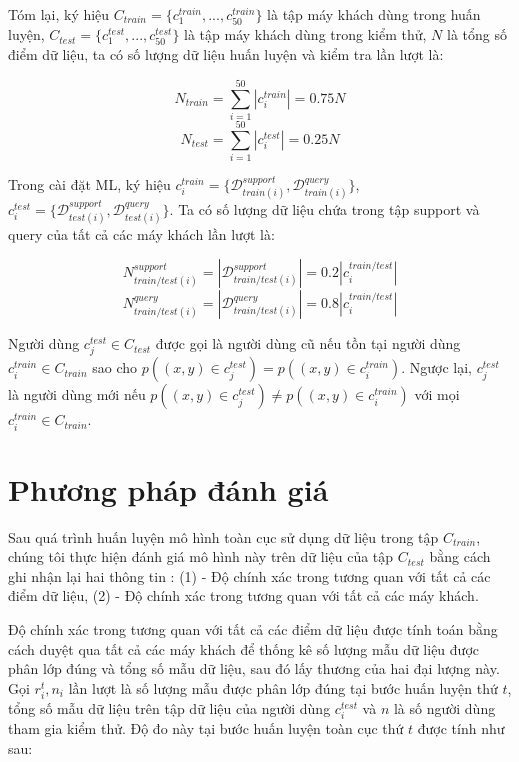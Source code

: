 Tóm lại, ký hiệu $C_{train} = \{c^{train}_1,...,c^{train}_{50}\}$ là tập máy khách dùng trong huấn luyện, $C_{test} = \{c^{test}_1,...,c^{test}_{50}\}$ là tập máy khách dùng trong kiểm thử, $N$ là tổng số điểm dữ liệu, ta có số lượng dữ liệu huấn luyện và kiểm tra lần lượt là:

\begin{equation*}
    N_{train} = \sum_{i=1}^{50} \left|c^{train}_i\right| = 0.75N
\end{equation*}
\begin{equation*}
    N_{test} = \sum_{i=1}^{50} \left|c^{test}_i\right| = 0.25N
\end{equation*}

Trong cài đặt ML, ký hiệu $c^{train}_i = \{\mathcal{D}_{train(i)}^{support}, \mathcal{D}_{train(i)}^{query}\}$, $ c^{test}_i = \{\mathcal{D}_{test(i)}^{support}, \mathcal{D}_{test(i)}^{query}\}$. Ta có số lượng dữ liệu chứa trong tập support và query của tất cả các máy khách lần lượt là:

\begin{equation*}
    N_{train/test(i)}^{support} = \left|\mathcal{D}_{train/test(i)}^{support}\right| = 0.2 \left|c_i^{train/test}\right|
\end{equation*}
\begin{equation*}
    N_{train/test(i)}^{query} = \left|\mathcal{D}_{train/test(i)}^{query}\right| = 0.8 \left|c^{train/test}_i\right|
\end{equation*}

Người dùng $c_j^{test} \in C_{test}$ được gọi là người dùng cũ nếu tồn tại người dùng $c_i^{train}\in C_{train}$ sao cho $p\left((x,y)\in c_j^{test}\right) = p\left((x,y)\in c_i^{train}\right)$. Ngược lại, $c_j^{test}$ là người dùng mới nếu $p\left((x,y)\in c_j^{test}\right) \ne p\left((x,y)\in c_i^{train}\right)$ với mọi $c_i^{train}\in C_{train}$.

\section{Phương pháp đánh giá}

Sau quá trình huấn luyện mô hình toàn cục sử dụng dữ liệu trong tập $C_{train}$, chúng tôi thực hiện đánh giá mô hình này trên dữ liệu của tập $C_{test}$ bằng cách ghi nhận lại hai thông tin \cite{chen2018federated}: (1) - Độ chính xác trong tương quan với tất cả các điểm dữ liệu, (2) - Độ chính xác trong tương quan với tất cả các máy khách.

Độ chính xác trong tương quan với tất cả các điểm dữ liệu được tính toán bằng cách duyệt qua tất cả các máy khách để thống kê số lượng mẫu dữ liệu được phân lớp đúng và tổng số mẫu dữ liệu, sau đó lấy thương của hai đại lượng này. Gọi $r_i^t, n_i$ lần lượt là số lượng mẫu được phân lớp đúng tại bước huấn luyện thứ $t$, tổng số mẫu dữ liệu trên tập dữ liệu của người dùng $c_i^{test}$ và $n$ là số người dùng tham gia kiểm thử. Độ đo này tại bước huấn luyện toàn cục thứ $t$ được tính như sau:

